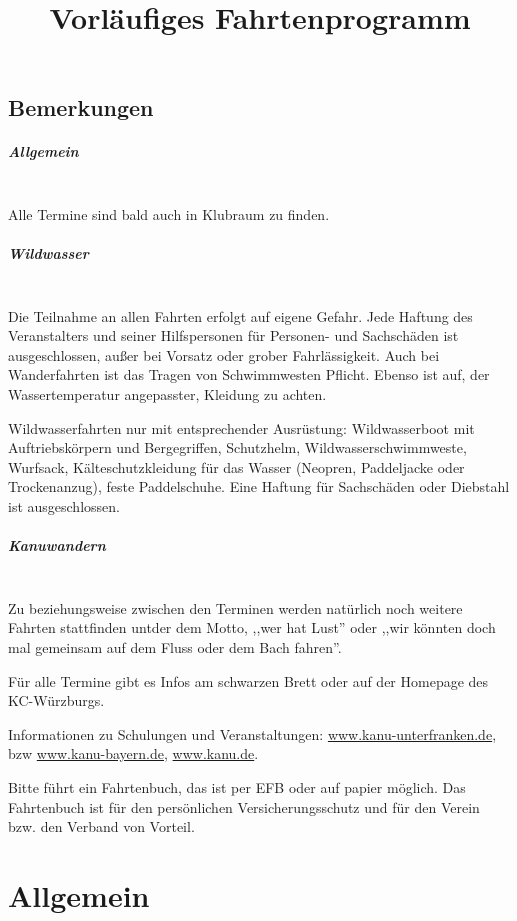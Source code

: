 \documentclass[12pt, a4paper]{report}
\title{Vorläufiges Fahrtenprogramm}
\date{}
\begin{document}
\begingroup
    \hypersetup{hidelinks}
    \tableofcontents\thispagestyle{fancy}
\endgroup
\reversemarginpar

\section*{Bemerkungen}\paragraph{Allgemein}\mbox{}\\
Alle Termine sind bald auch in Klubraum zu finden.
\paragraph{Wildwasser}\mbox{}\\
Die Teilnahme an allen Fahrten erfolgt auf eigene Gefahr. Jede Haftung des Veranstalters und seiner Hilfspersonen für Personen- und Sachschäden ist ausgeschlossen, außer bei Vorsatz oder grober Fahrlässigkeit. Auch bei Wanderfahrten ist das Tragen von Schwimmwesten Pflicht. Ebenso ist auf, der Wassertemperatur angepasster, Kleidung zu achten.


Wildwasserfahrten nur mit entsprechender Ausrüstung: Wildwasserboot mit Auftriebskörpern und Bergegriffen, Schutzhelm, Wildwasserschwimmweste, Wurfsack, Kälteschutzkleidung für das Wasser (Neopren, Paddeljacke oder Trockenanzug), feste Paddelschuhe. Eine Haftung für Sachschäden oder Diebstahl ist ausgeschlossen.

\paragraph{Kanuwandern}\mbox{}\\
Zu beziehungsweise zwischen den Terminen werden natürlich noch weitere Fahrten stattfinden untder dem Motto, ,,wer hat Lust'' oder ,,wir könnten doch mal gemeinsam auf dem Fluss oder dem Bach fahren''.

Für alle Termine gibt es Infos am schwarzen Brett oder auf der Homepage des KC-Würzburgs.

Informationen zu Schulungen und Veranstaltungen: \url{www.kanu-unterfranken.de}, bzw \url{www.kanu-bayern.de}, \url{www.kanu.de}.

Bitte führt ein Fahrtenbuch, das ist per EFB oder auf papier möglich. Das Fahrtenbuch ist für den persönlichen Versicherungsschutz und für den Verein bzw. den Verband von Vorteil.\chapter*{Allgemein}
\thispagestyle{Allgemein}
\pagestyle{Allgemein}
\end{document}

